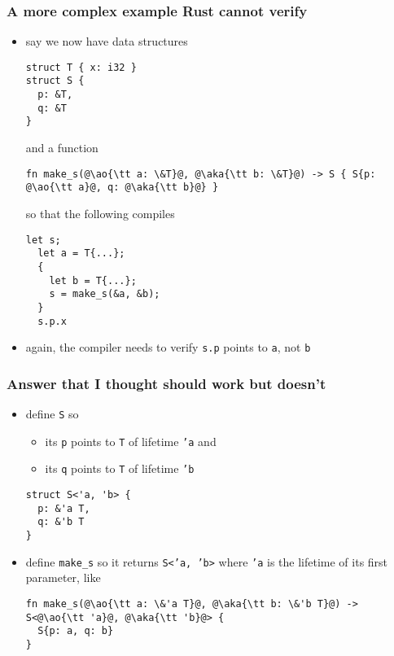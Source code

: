 \documentclass[12pt,dvipdfmx]{beamer}
\newcommand{\ao}[1]{{\color{blue}#1}}
\newcommand{\aka}[1]{{\color{red}#1}}
\begin{document}
\begin{frame}[fragile]
  \frametitle{A more complex example Rust cannot verify}
  \begin{itemize}
  \item say we now have data structures
\begin{lstlisting}[basicstyle=\ttfamily\tiny]
struct T { x: i32 }
struct S {
  p: &T,
  q: &T
}    
\end{lstlisting}
and a function 
\begin{lstlisting}[basicstyle=\ttfamily\tiny]
fn make_s(@\ao{\tt a: \&T}@, @\aka{\tt b: \&T}@) -> S { S{p: @\ao{\tt a}@, q: @\aka{\tt b}@} }
\end{lstlisting}
so that the following compiles
\begin{lstlisting}[basicstyle=\ttfamily\tiny]
  let s;
  let a = T{...};
  {
    let b = T{...};
    s = make_s(&a, &b);
  }
  s.p.x
\end{lstlisting}
\item again, the compiler needs to verify {\tt s.p} points to {\tt a}, not {\tt b}
\end{itemize}
\end{frame}

\begin{frame}[fragile]
  \frametitle{Answer that I thought should work but doesn't}
  \begin{itemize}
  \item define {\tt S} so
    \begin{itemize}
    \item its {\tt p} points to {\tt T} of lifetime {\tt 'a} and
    \item its {\tt q} points to {\tt T} of lifetime {\tt 'b}
    \end{itemize}
\begin{lstlisting}
struct S<'a, 'b> {
  p: &'a T,
  q: &'b T
}    
\end{lstlisting}
\item define {\tt make\_s} so it returns {\tt S<'a, 'b>}
  where {\tt 'a} is the lifetime of its first parameter, like
\begin{lstlisting}
fn make_s(@\ao{\tt a: \&'a T}@, @\aka{\tt b: \&'b T}@) -> S<@\ao{\tt 'a}@, @\aka{\tt 'b}@> {
  S{p: a, q: b}
}    
\end{lstlisting}
\end{itemize}
\end{frame}
\end{document}
